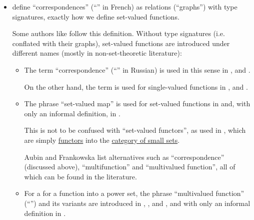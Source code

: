 \begin{remark}
\begin{itemize}
    A thorough discussion of indexed families can be found in \cite[\S 9]{Halmos1960NaiveSetTheory}. Halmos defines them as functions, but treats them like we do.

    \item \Textcite[def. II.3.2]{Bourbaki2004TheoryOfSets} define \enquote{correspondences} (\enquote{} in French) as relations (\enquote{graphs}) with type signatures, exactly how we define set-valued functions.

    Some authors like \textcite[17]{КусраевКутателадзе2005БулевозначныйАнализ} follow this definition. Without type signatures (i.e. conflated with their graphs), set-valued functions are introduced under different names (mostly in non-set-theoretic literature):
    \begin{itemize}
      \item The term \enquote{correspondence} (\enquote{} in Russian) is used in this sense in
      \cite[77]{Lang2002Algebra},
      \cite[253]{ПоловинкинБалашов2007ВыпуклыйАнализ} and
      \cite[49]{БелоусовТкачёв2004ДискретнаяМатематика}.

      On the other hand, the term is used for single-valued functions in
      \cite[12]{Jech2006SetTheory},
      \cite[30]{Halmos1960NaiveSetTheory} and
      \cite[12]{Курош1973ОбщаяАлгебра}.

      \item The phrase \enquote{set-valued map} is used for set-valued functions in \cite[34]{AubinFrankowska1990SetValuedAnalysis} and, with only an informal definition, in \cite[2]{DontchevRockafellar2014SolutionMappings}.

      This is not to be confused with \enquote{set-valued functors}, as used in \cite[\S 8.1]{Awodey2010CategoryTheory}, which are simply \hyperref[def:functor]{functors} into the \hyperref[def:category_of_small_sets]{category of small sets}.

      Aubin and Frankowska list alternatives such as \enquote{correspondence} (discussed above), \enquote{multifunction} and \enquote{multivalued function}, all of which can be found in the literature.

      \item For a for a function into a power set, the phrase \enquote{multivalued function} (\enquote{}) and its variants are introduced in
      \cite[278]{Deimling1985NonlinearFA},
      \cite[3]{GondranMinoux1984GraphsAndAlgorithms},
      \cite[42]{ИоффеТихомиров1974ЭкстремальныеЗадачи} and
      \cite[147]{ФедорчукФилиппов2006ОбщаяТопология},
      and with only an informal definition in
      \cite[113]{Арутюнов2014ВыпуклыйАнализ}.
    \end{itemize}


\end{itemize}
\end{remark}
